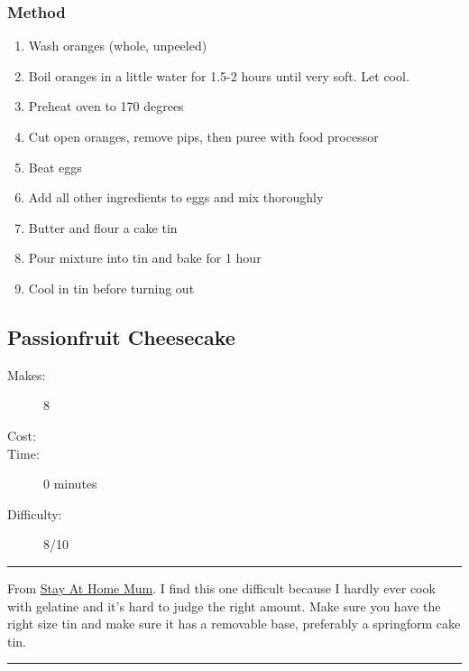 \documentclass[]{article}
\begin{document}
\subsubsection*{\Large Method}
\begin{enumerate}[font=\huge\color{accent}]
	\item Wash oranges (whole, unpeeled)
	\item Boil oranges in a little water for 1.5-2 hours until very soft. Let cool.
	\item Preheat oven to 170 degrees
	\item Cut open oranges, remove pips, then puree with food processor
	\item Beat eggs
	\item Add all other ingredients to eggs and mix thoroughly
	\item Butter and flour a cake tin
	\item Pour mixture into tin and bake for 1 hour
	\item Cool in tin before turning out
\end{enumerate}
\newpage
{}\label{rec:Passionfruit Cheesecake}
\subsection*{\center\huge Passionfruit Cheesecake}
\begin{description}
\item[Makes:] 8 
\item[Cost:] \textdollar
\item[Time:] 0 minutes
\item[Difficulty:] 8/10
\end{description}
\vspace{0.2cm}\hrule\vspace{0.5cm}
\begin{adjustwidth}{0.5 cm}{0.5 cm}

From \href{https://www.stayathomemum.com.au/recipes/no-bake-passionfruit-jelly-cheesecake/}{Stay At Home Mum}. I find this one difficult because I hardly ever cook with gelatine and it’s hard to judge the right amount. Make sure you have the right size tin and make sure it has a removable base, preferably a springform cake tin. \hfill{}\color{black}

\end{adjustwidth}
\vspace{0.5cm}\hrule
\end{document}

